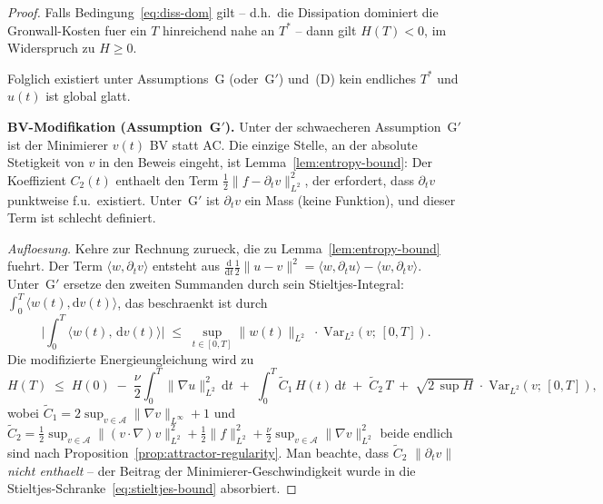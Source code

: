 \documentclass[12pt,a4paper]{article}
\theoremstyle{definition}
\theoremstyle{plain}
\theoremstyle{remark}
\begin{document}
\begin{proof}
Falls Bedingung~\eqref{eq:diss-dom} gilt -- d.h.\ die Dissipation
dominiert die Gronwall-Kosten fuer ein $T$ hinreichend nahe an
$T^*$ -- dann gilt $H(T) < 0$, im Widerspruch zu $H \ge 0$.

Folglich existiert unter Assumptions~G (oder~G$'$) und~(D) kein endliches $T^*$
und $u(t)$ ist global glatt.

\medskip
\noindent\textbf{BV-Modifikation (Assumption~G$'$).}\;
Unter der schwaecheren Assumption~G$'$ ist der Minimierer $v(t)$ BV statt
AC. Die einzige Stelle, an der absolute Stetigkeit von $v$ in den
Beweis eingeht, ist Lemma~\ref{lem:entropy-bound}: Der Koeffizient
$C_2(t)$ enthaelt den Term $\tfrac{1}{2}\|f - \partial_t v\|_{L^2}^2$,
der erfordert, dass $\partial_t v$ punktweise f.u.\ existiert. Unter~G$'$
ist $\partial_t v$ ein Mass (keine Funktion), und dieser Term ist
schlecht definiert.

\emph{Aufloesung.}\;
Kehre zur Rechnung zurueck, die zu Lemma~\ref{lem:entropy-bound} fuehrt.
Der Term $\langle w, \partial_t v\rangle$ entsteht aus
$\frac{\mathrm{d}}{\mathrm{d}t}\tfrac{1}{2}\|u-v\|^2
= \langle w, \partial_t u\rangle - \langle w, \partial_t v\rangle$.
Unter~G$'$ ersetze den zweiten Summanden durch sein Stieltjes-Integral:
$\int_0^T \langle w(t), \mathrm{d}v(t)\rangle$, das beschraenkt ist durch
\begin{equation}\label{eq:stieltjes-bound}
  \biggl|\int_0^T \langle w(t),\, \mathrm{d}v(t)\rangle\biggr|
  \;\le\;
  \sup_{t \in [0,T]} \|w(t)\|_{L^2}
  \;\cdot\;
  \mathrm{Var}_{L^2}(v;\, [0,T]).
\end{equation}
Die modifizierte Energieungleichung wird zu
\begin{equation}\label{eq:H-integral-BV}
  H(T) \;\le\; H(0)
  \;-\; \frac{\nu}{2}\int_0^T \|\nabla u\|_{L^2}^2\,\mathrm{d}t
  \;+\; \int_0^T \widetilde{C}_1\,H(t)\,\mathrm{d}t
  \;+\; \widetilde{C}_2\,T
  \;+\; \sqrt{2\,\sup H}\;\cdot\;
    \mathrm{Var}_{L^2}(v;\,[0,T]),
\end{equation}
wobei $\widetilde{C}_1 = 2\sup_{v \in \mathcal{A}}
\|\nabla v\|_{L^\infty} + 1$ und $\widetilde{C}_2 =
\tfrac{1}{2}\sup_{v \in \mathcal{A}}\|(v\cdot\nabla)v\|_{L^2}^2
+ \tfrac{1}{2}\|f\|_{L^2}^2 + \tfrac{\nu}{2}\sup_{v \in \mathcal{A}}
\|\nabla v\|_{L^2}^2$ beide endlich sind nach
Proposition~\ref{prop:attractor-regularity}. Man beachte, dass $\widetilde{C}_2$
$\|\partial_t v\|$ \emph{nicht enthaelt} -- der Beitrag der Minimierer-Geschwindigkeit
wurde in die Stieltjes-Schranke~\eqref{eq:stieltjes-bound} absorbiert.


\end{proof}
\end{document}

